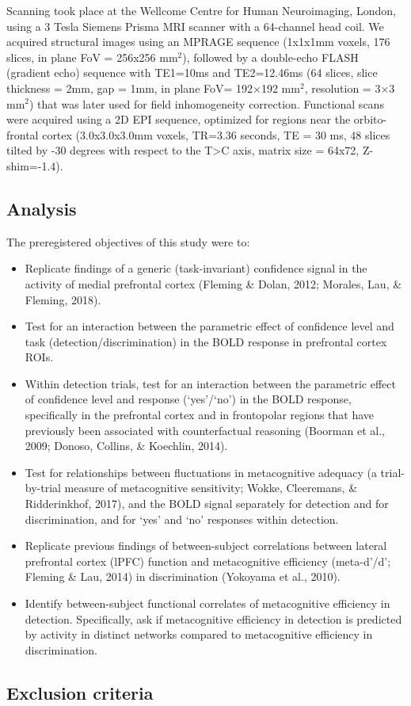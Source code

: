 \documentclass[12pt,twoside]{reedthesis}
\begin{document}
Scanning took place at the Wellcome Centre for Human Neuroimaging, London, using a 3 Tesla Siemens Prisma MRI scanner with a 64-channel head coil.
We acquired structural images using an MPRAGE sequence (1x1x1mm voxels, 176 slices, in plane FoV = 256x256 mm\(^2\)), followed by a double-echo FLASH (gradient echo) sequence with TE1=10ms and TE2=12.46ms (64 slices, slice thickness = 2mm, gap = 1mm, in plane FoV= 192×192 mm\(^2\), resolution = 3×3 mm\(^2\)) that was later used for field inhomogeneity correction. Functional scans were acquired using a 2D EPI sequence, optimized for regions near the orbito-frontal cortex (3.0x3.0x3.0mm voxels, TR=3.36 seconds, TE = 30 ms, 48 slices tilted by -30 degrees with respect to the T\textgreater C axis, matrix size = 64x72, Z-shim=-1.4).

\hypertarget{analysis-1}{%
\subsection{Analysis}\label{analysis-1}}

The preregistered objectives of this study were to:
\begin{itemize}
\item
  Replicate findings of a generic (task-invariant) confidence signal in the activity of medial prefrontal cortex (Fleming \& Dolan, 2012; Morales, Lau, \& Fleming, 2018).
\item
  Test for an interaction between the parametric effect of confidence level and task (detection/discrimination) in the BOLD response in prefrontal cortex ROIs.
\item
  Within detection trials, test for an interaction between the parametric effect of confidence level and response (`yes'/`no') in the BOLD response, specifically in the prefrontal cortex and in frontopolar regions that have previously been associated with counterfactual reasoning (Boorman et al., 2009; Donoso, Collins, \& Koechlin, 2014).
\item
  Test for relationships between fluctuations in metacognitive adequacy (a trial-by-trial measure of metacognitive sensitivity; Wokke, Cleeremans, \& Ridderinkhof, 2017), and the BOLD signal separately for detection and for discrimination, and for `yes' and `no' responses within detection.
\item
  Replicate previous findings of between-subject correlations between lateral prefrontal cortex (lPFC) function and metacognitive efficiency (meta-d'/d'; Fleming \& Lau, 2014) in discrimination (Yokoyama et al., 2010).
\item
  Identify between-subject functional correlates of metacognitive efficiency in detection. Specifically, ask if metacognitive efficiency in detection is predicted by activity in distinct networks compared to metacognitive efficiency in discrimination.
\end{itemize}
\hypertarget{exclusion-criteria}{%
\subsection{Exclusion criteria}\label{exclusion-criteria}}
\end{document}
